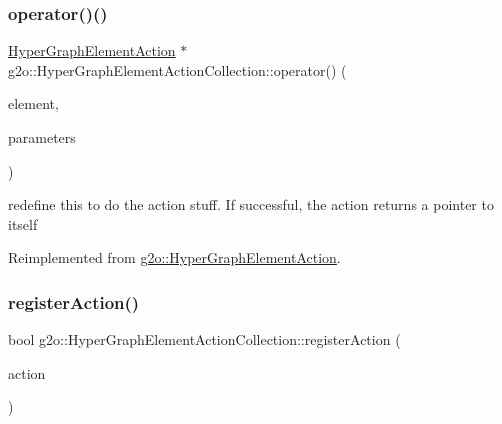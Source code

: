 \subsubsection{\texorpdfstring{operator()()}{operator()()}\hspace{0.1cm}{\footnotesize\ttfamily [2/2]}}
{\footnotesize\ttfamily \mbox{\hyperlink{classg2o_1_1_hyper_graph_element_action}{Hyper\+Graph\+Element\+Action}} $\ast$ g2o\+::\+Hyper\+Graph\+Element\+Action\+Collection\+::operator() (\begin{DoxyParamCaption}\item[{const \mbox{\hyperlink{structg2o_1_1_hyper_graph_1_1_hyper_graph_element}{Hyper\+Graph\+::\+Hyper\+Graph\+Element}} $\ast$}]{element,  }\item[{\mbox{\hyperlink{structg2o_1_1_hyper_graph_element_action_1_1_parameters}{Hyper\+Graph\+Element\+Action\+::\+Parameters}} $\ast$}]{parameters }\end{DoxyParamCaption})\hspace{0.3cm}{\ttfamily [virtual]}}



redefine this to do the action stuff. If successful, the action returns a pointer to itself 



Reimplemented from \mbox{\hyperlink{classg2o_1_1_hyper_graph_element_action_a0dc2ff77e22791e32810d2c43b7154ad}{g2o\+::\+Hyper\+Graph\+Element\+Action}}.

\mbox{\label{classg2o_1_1_hyper_graph_element_action_collection_a9eb641e9c9bb22f3540dc98c2c750ea9}} 
\subsubsection{\texorpdfstring{register\+Action()}{registerAction()}}
{\footnotesize\ttfamily bool g2o\+::\+Hyper\+Graph\+Element\+Action\+Collection\+::register\+Action (\begin{DoxyParamCaption}\item[{\mbox{\hyperlink{classg2o_1_1_hyper_graph_element_action}{Hyper\+Graph\+Element\+Action}} $\ast$}]{action }\end{DoxyParamCaption})}

